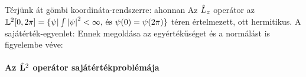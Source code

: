     Térjünk át gömbi koordináta-rendszerre:
    ahonnan 
    Az $\hat{L}_z$ operátor az $\mathbb{L}^2[0,2\pi]=\{\psi | \int\left\lvert\psi\right\rvert^2<\infty\text{, és }\psi(0)=\psi(2\pi)\}$ téren értelmezett, ott hermitikus. A sajátérték-egyenlet:
    Ennek megoldása az egyértékűséget és a normálást is figyelembe véve:
    
   \paragraph{Az $\hat{\mathbf{L}}^2$ operátor sajátértékproblémája}\label{ss:06-L2spme}
    
